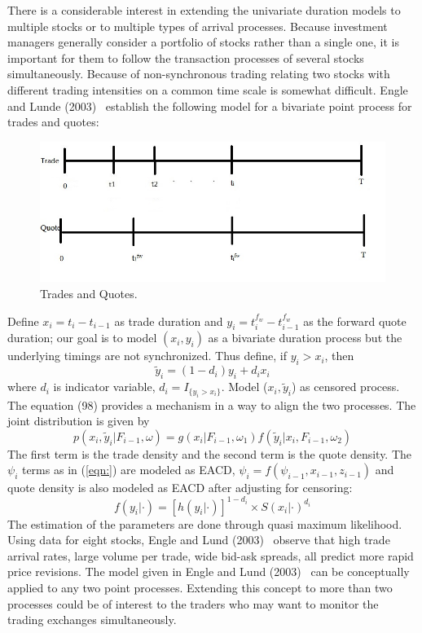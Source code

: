 There is a considerable interest in extending the univariate duration models to multiple stocks or to multiple types of arrival processes. Because investment managers generally consider a portfolio of stocks rather than a single one, it is important for them to follow the transaction processes of several stocks simultaneously. Because of non-synchronous trading relating two stocks with different trading intensities on a common time scale is somewhat difficult. Engle and Lunde (2003)~\cite{englelunde} establish the following model for a bivariate point process for trades and quotes:
	\begin{figure}[!ht]
	\centering
	\includegraphics[width=\textwidth]{chapters/chapter_uvts/figures/33d3.jpg}
	\caption{Trades and Quotes. \label{fig:tradeactdoubline}}
	\end{figure}
Define $x_i = t_i - t_{i-1}$ as trade duration and $y_i = t_i^{f_w} - t_{i-1}^{f_w}$ as the forward quote duration; our goal is to model $(x_i,y_i)$ as a bivariate duration process but the underlying timings are not synchronized. Thus define, if $y_i > x_i$, then
	\begin{equation}\label{eqn:anothertildey}
	\widetilde{y}_i = (1 - d_i)y_i + d_ix_i
	\end{equation}
where $d_i$ is indicator variable, $d_i = I_{\{y_i>x_i\}}$. Model ($x_i,\widetilde{y}_i$) as censored process. The equation (98) provides a mechanism in a way to align the two processes. The joint distribution is given by
	\begin{equation}\label{eqn:2pxiyi}
	p(x_i,\widetilde{y}_i | F_{i-1},\omega) = g(x_i|F_{i-1},\omega_1) f(\widetilde{y}_i | x_i,F_{i-1},\omega_2)
	\end{equation}
The first term is the trade density and the second term is the quote density. The $\psi_i$ terms as in (\ref{eqn:}) are modeled as EACD, $\psi_i= f(\psi_{i-1},x_{i-1},z_{i-1})$ and quote density is also modeled as EACD after adjusting for censoring:
	\begin{equation}\label{eqn:2fdot}
	f(y_i|\cdot) = [h(y_i|\cdot)]^{1-d_i} \times S(x_i|\cdot)^{d_i}
	\end{equation}
The estimation of the parameters are done through quasi maximum likelihood. Using data for eight stocks, Engle and Lund (2003)~\cite{englelunde} observe that high trade arrival rates, large volume per trade, wide bid-ask spreads, all predict more rapid price revisions. The model given in Engle and Lund (2003)~\cite{englelunde} can be conceptually applied to any two point processes. Extending this concept to more than two processes could be of interest to the traders who may want to monitor the trading exchanges simultaneously. 


